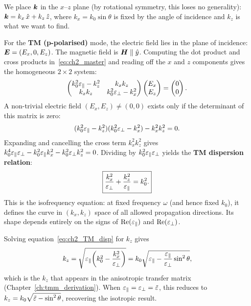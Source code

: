 We place $\bm{k}$ in the $x$--$z$ plane (by rotational symmetry, this
loses no generality): $\bm{k} = k_x\,\hat{x} + k_z\,\hat{z}$, where
$k_x = k_0\sin\theta$ is fixed by the angle of incidence and
$k_z$ is what we want to find.

For the \textbf{TM (p-polarised)} mode, the electric field lies in the plane
of incidence: $\bm{E} = (E_x, 0, E_z)$. The magnetic field is $\bm{H}\parallel\hat{y}$.
Computing the dot product and cross products in~\eqref{eq:ch2_master} and
reading off the $x$ and $z$ components gives the homogeneous $2\times 2$
system:
\begin{equation}
  \begin{pmatrix}
    k_0^2\varepsilon_{\parallel} - k_z^2 & k_x k_z \\
    k_x k_z & k_0^2\varepsilon_{\perp} - k_x^2
  \end{pmatrix}
  \begin{pmatrix} E_x \\ E_z \end{pmatrix}
  = \begin{pmatrix} 0 \\ 0 \end{pmatrix}.
  \label{eq:ch2_2x2}
\end{equation}
A non-trivial electric field $(E_x, E_z) \neq (0,0)$ exists only if the
determinant of this matrix is zero:
\begin{equation}
  (k_0^2\varepsilon_{\parallel} - k_z^2)(k_0^2\varepsilon_{\perp} - k_x^2) - k_x^2 k_z^2 = 0.
  \label{eq:ch2_det}
\end{equation}
Expanding and cancelling the cross term $k_x^2 k_z^2$ gives
$k_0^4\varepsilon_{\parallel}\varepsilon_{\perp} - k_0^2\varepsilon_{\parallel} k_x^2 - k_0^2\varepsilon_{\perp} k_z^2 = 0$.
Dividing by $k_0^2\varepsilon_{\parallel}\varepsilon_{\perp}$ yields the \textbf{TM dispersion relation}:
\begin{equation}
  \boxed{\frac{k_x^2}{\varepsilon_{\perp}} + \frac{k_z^2}{\varepsilon_{\parallel}} = k_0^2.}
  \label{eq:ch2_TM_disp}
\end{equation}
This is the isofrequency equation: at fixed frequency $\omega$ (and hence
fixed $k_0$), it defines the curve in $(k_x, k_z)$ space of all allowed
propagation directions. Its shape depends entirely on the signs of
$\operatorname{Re}(\varepsilon_{\parallel})$ and $\operatorname{Re}(\varepsilon_{\perp})$.

Solving equation~\eqref{eq:ch2_TM_disp} for $k_z$ gives
\begin{equation}
  k_z = \sqrt{\varepsilon_{\parallel}\!\left(k_0^2 - \frac{k_x^2}{\varepsilon_{\perp}}\right)}
      = k_0\sqrt{\varepsilon_{\parallel} - \frac{\varepsilon_{\parallel}}{\varepsilon_{\perp}}\sin^2\theta},
  \label{eq:ch2_kz_aniso}
\end{equation}
which is the $k_z$ that appears in the anisotropic transfer matrix
(Chapter~\ref{ch:tmm_derivation}). When $\varepsilon_{\parallel} = \varepsilon_{\perp} = \tilde{\varepsilon}$,
this reduces to $k_z = k_0\sqrt{\tilde{\varepsilon} - \sin^2\theta}$, recovering
the isotropic result.

